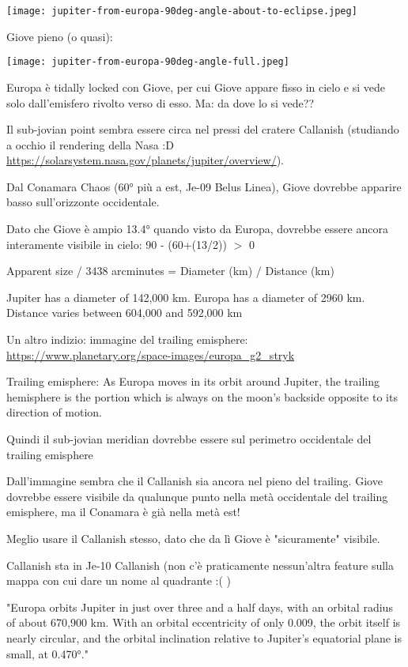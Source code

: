 \documentclass[a4paper,10pt,openany,oneside]{memoir}
\begin{document}
\texttt{[image: jupiter-from-europa-90deg-angle-about-to-eclipse.jpeg]}

Giove pieno (o quasi):

\texttt{[image: jupiter-from-europa-90deg-angle-full.jpeg]}

Europa è tidally locked con Giove, per cui Giove appare fisso in cielo e si vede solo dall'emisfero rivolto verso di esso. Ma: da dove lo si vede??

Il sub-jovian point sembra essere circa nel pressi del cratere Callanish (studiando a occhio il rendering della Nasa :D \url{https://solarsystem.nasa.gov/planets/jupiter/overview/}). 

Dal Conamara Chaos (60° più a est, Je-09 Belus Linea), Giove dovrebbe apparire basso sull'orizzonte occidentale.

Dato che Giove è ampio 13.4° quando visto da Europa, dovrebbe essere ancora interamente visibile in cielo: 90 - (60+(13/2)) $>$ 0

Apparent size / 3438 arcminutes =  Diameter (km) / Distance (km)

Jupiter has a diameter of 142,000 km. Europa has a diameter of 2960 km. Distance varies between 604,000 and 592,000 km

Un altro indizio: immagine del trailing emisphere: \url{https://www.planetary.org/space-images/europa_g2_stryk} 

Trailing emisphere: As Europa moves in its orbit around Jupiter, the trailing hemisphere is the portion which is always on the moon's backside opposite to its direction of motion.

Quindi il sub-jovian meridian dovrebbe essere sul perimetro occidentale del trailing emisphere

Dall'immagine sembra che il Callanish sia ancora nel pieno del trailing. Giove dovrebbe essere visibile da qualunque punto nella metà occidentale del trailing emisphere, ma il Conamara è già nella metà est!

Meglio usare il Callanish stesso, dato che da lì Giove è "sicuramente" visibile.

Callanish sta in Je-10 Callanish (non c'è praticamente nessun'altra feature sulla mappa con cui dare un nome al quadrante :( )

"Europa orbits Jupiter in just over three and a half days, with an orbital radius of about 670,900 km. With an orbital eccentricity of only 0.009, the orbit itself is nearly circular, and the orbital inclination relative to Jupiter's equatorial plane is small, at 0.470°."
\end{document}
